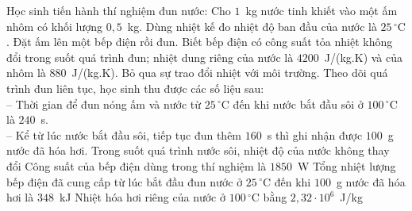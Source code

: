 	\begin{ex}%
		Học sinh tiến hành thí nghiệm đun nước: Cho $1$~kg nước tinh khiết vào một ấm nhôm có khối lượng $0{,}5$~kg. Dùng nhiệt kế đo nhiệt độ ban đầu của nước là $25\,^\circ\text{C}$. Đặt ấm lên một bếp điện rồi đun. Biết bếp điện có công suất tỏa nhiệt không đổi trong suốt quá trình đun; nhiệt dung riêng của nước là $4200$~J/(kg.K) và của nhôm là $880$~J/(kg.K). Bỏ qua sự trao đổi nhiệt với môi trường. Theo dõi quá trình đun liên tục, học sinh thu được các số liệu sau:\\
		-- Thời gian để đun nóng ấm và nước từ $25\,^\circ\text{C}$ đến khi nước bắt đầu sôi ở $100\,^\circ\text{C}$ là $240$~s.\\
		-- Kể từ lúc nước bắt đầu sôi, tiếp tục đun thêm $160$~s thì ghi nhận được $100$~g nước đã hóa hơi.
		\choiceTFt
		{\True Trong suốt quá trình nước sôi, nhiệt độ của nước không thay đổi}
		{Công suất của bếp điện dùng trong thí nghiệm là $1850$~W}
		{Tổng nhiệt lượng bếp điện đã cung cấp từ lúc bắt đầu đun nước ở $25\,^\circ\text{C}$ đến khi $100$~g nước đã hóa hơi là $348$~kJ}
		{\True Nhiệt hóa hơi riêng của nước ở $100\,^\circ\text{C}$ bằng $2{,}32\cdot 10^6$~J/kg}
	\end{ex}

